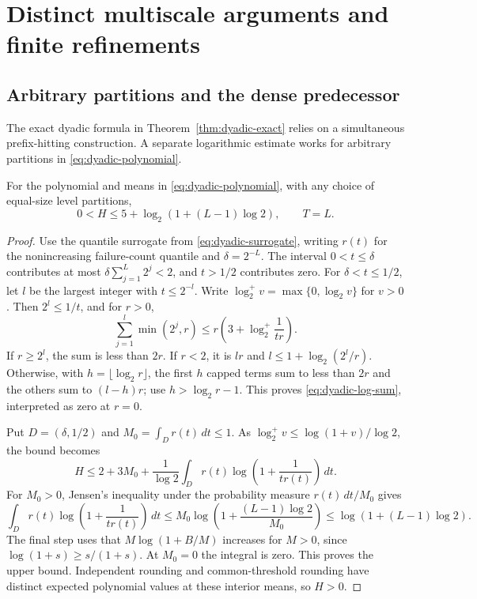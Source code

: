 \section{Distinct multiscale arguments and finite refinements}
\label{app:dyadic-alternatives}
\subsection{Arbitrary partitions and the dense predecessor}
The exact dyadic formula in Theorem~\ref{thm:dyadic-exact} relies on a
simultaneous prefix-hitting construction. A separate logarithmic estimate
works for arbitrary partitions in \eqref{eq:dyadic-polynomial}.

\begin{proposition}
\label{prop:arbitrary-dyadic}
For the polynomial and means in \eqref{eq:dyadic-polynomial}, with any
choice of equal-size level partitions,
\[
 0<H\le5+\log_2(1+(L-1)\log2),\qquad T=L.
\]
\end{proposition}
\begin{proof}
Use the quantile surrogate from \eqref{eq:dyadic-surrogate}, writing
$r(t)$ for the nonincreasing failure-count quantile and $\delta=2^{-L}$.
The interval $0<t\le\delta$ contributes at most
$\delta\sum_{j=1}^L2^j<2$, and $t>1/2$ contributes zero. For
$\delta<t\le1/2$, let $l$ be the largest integer with $t\le2^{-l}$.
Write $\log_2^+v=\max\{0,\log_2v\}$ for $v>0$.
Then $2^l\le1/t$, and for $r>0$,
\begin{equation}\label{eq:dyadic-log-sum}
 \sum_{j=1}^l\min(2^j,r)
 \le r\left(3+\log_2^+\frac1{tr}\right).
\end{equation}
If $r\ge2^l$, the sum is less than $2r$. If $r<2$, it is $lr$ and
$l\le1+\log_2(2^l/r)$. Otherwise, with $h=\lfloor\log_2r\rfloor$,
the first $h$ capped terms sum to less than $2r$ and the others sum to
$(l-h)r$; use $h>\log_2r-1$. This proves
\eqref{eq:dyadic-log-sum}, interpreted as zero at $r=0$.

Put $D=(\delta,1/2)$ and $M_0=\int_Dr(t)\,dt\le1$. As
$\log_2^+v\le\log(1+v)/\log2$, the bound becomes
\[
 H\le2+3M_0+\frac1{\log2}
       \int_Dr(t)\log\left(1+\frac1{tr(t)}\right)\,dt.
\]
For $M_0>0$, Jensen's inequality under the probability measure
$r(t)\,dt/M_0$ gives
\[
 \int_Dr(t)\log\left(1+\frac1{tr(t)}\right)\,dt
 \le M_0\log\left(1+\frac{(L-1)\log2}{M_0}\right)
 \le\log(1+(L-1)\log2).
\]
The final step uses that $M\log(1+B/M)$ increases for $M>0$, since
$\log(1+s)\ge s/(1+s)$. At $M_0=0$ the integral is zero. This proves
the upper bound. Independent rounding and common-threshold rounding
have distinct expected polynomial values at these interior means, so $H>0$.
\end{proof}

